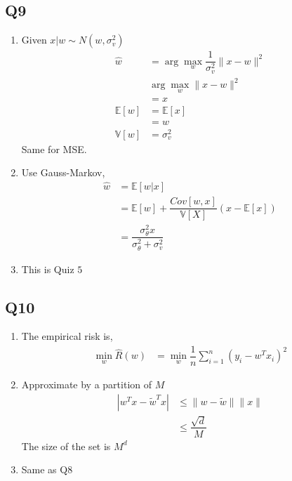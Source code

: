 \documentclass{article}
\begin{document}
\subsection{Q9}
\begin{enumerate}
\item Given $x  | w \sim  N\left(w, \sigma_{v}^{2}\right)$
\begin{align*}
\hat{w} &= \arg\displaystyle\max_{w} \dfrac{1}{\sigma_{v}^{2}} \| x - w \|^{2}
\\ &\arg\displaystyle\max_{w} \| x - w \|^{2}
\\ &= x 
\\ \mathbb{E}\left[w\right] &= \mathbb{E}\left[x\right]
\\ &= w 
\\ \mathbb{V}\left[w\right] &= \sigma_{v}^{2}
\end{align*}
Same for MSE.

\item Use Gauss-Markov,
\begin{align*}
\hat{w} &= \mathbb{E}\left[w | x\right]
\\ &= \mathbb{E}\left[w\right] + \dfrac{Cov\left[w, x\right]}{\mathbb{V}\left[X\right]} \left(x - \mathbb{E}\left[x\right]\right)
\\ &= \dfrac{\sigma_{\theta}^{2} x}{\sigma_{\theta}^{2} + \sigma_{v}^{2}}
\end{align*}
\item This is Quiz $5$
\end{enumerate}



\subsection{Q10}
\begin{enumerate}
\item The empirical risk is,
\begin{align*}
\displaystyle\min_{w} \hat{R}\left(w\right) &= \displaystyle\min_{w} \dfrac{1}{n} \displaystyle\sum_{i=1}^{n} \left(y_{i} - w^{T} x_{i}\right)^{2}
\end{align*}
\item Approximate by a partition of $M $
\begin{align*}
| w^{T} x - \tilde{w}^{T} x | &\leq  \| w - \tilde{w} \| \| x \|
\\ &\leq  \dfrac{\sqrt{d}}{M}
\end{align*}
The size of the set is $M^{d}$

\item Same as Q8
\end{enumerate}
\end{document}
